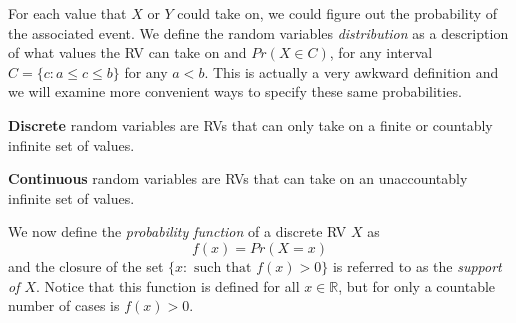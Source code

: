 \documentclass[]{book}
\begin{document}
For each value that \(X\) or \(Y\) could take on, we could figure out
the probability of the associated event. We define the random variables
\emph{distribution} as a description of what values the RV can take on
and \(Pr(X \in C)\), for any interval \(C = \{c: a\le c \le b\}\) for
any \(a<b\). This is actually a very awkward definition and we will
examine more convenient ways to specify these same probabilities.

\textbf{Discrete} random variables are RVs that can only take on a
finite or countably infinite set of values.

\textbf{Continuous} random variables are RVs that can take on an
unaccountably infinite set of values.

We now define the \emph{probability function} of a discrete RV \(X\) as
\[f(x) = Pr(X = x)\] and the closure of the set
\(\{x: \textrm{ such that } f(x) > 0\}\) is referred to as the
\emph{support of \(X\)}. Notice that this function is defined for all
\(x\in \mathbb{R}\), but for only a countable number of cases is
\(f(x)>0\).
\end{document}
